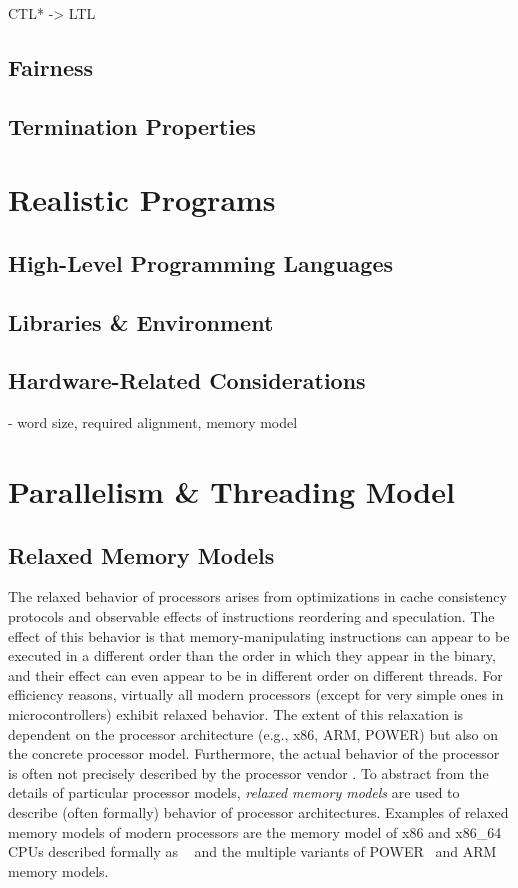 CTL* -> LTL

\subsection{Fairness}

\subsection{Termination Properties}

\section{Realistic Programs}

\subsection{High-Level Programming Languages}

\subsection{Libraries \& Environment}

\subsection{Hardware-Related Considerations}

- word size, required alignment, memory model

\section{Parallelism \& Threading Model}

\subsection{Relaxed Memory Models}

The relaxed behavior of processors arises from optimizations in cache consistency protocols and observable effects of instructions reordering and speculation.
The effect of this behavior is that memory-manipulating instructions can appear to be executed in a different order than the order in which they appear in the binary, and their effect can even appear to be in different order on different threads.
For efficiency reasons, virtually all modern processors (except for very simple ones in microcontrollers) exhibit relaxed behavior.
The extent of this relaxation is dependent on the processor architecture (e.g., x86, ARM, POWER) but also on the concrete processor model.
Furthermore, the actual behavior of the processor is often not precisely described by the processor vendor \cite{x86tso}.
To abstract from the details of particular processor models, \emph{relaxed memory models} are used to describe (often formally) behavior of processor architectures.
Examples of relaxed memory models of modern processors are the memory model of x86 and x86\_64 CPUs described formally as \xtso~\cite{x86tso} and the multiple variants of POWER~\cite{Sarkar2011,Mador-Haim2012} and ARM~\cite{Flur2016,Alglave2014,Pulte2017} memory models.

